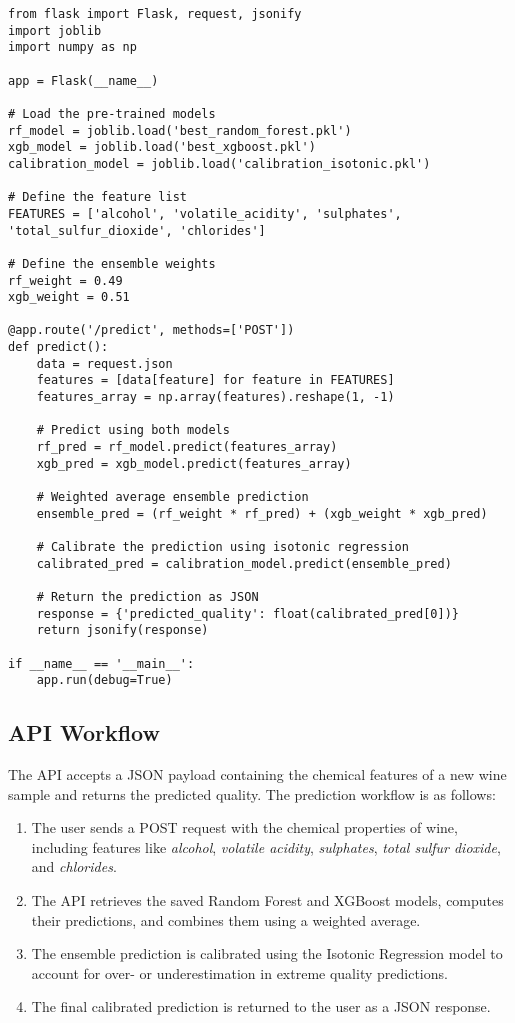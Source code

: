 \documentclass{article}
\begin{document}
\begin{verbatim}
from flask import Flask, request, jsonify
import joblib
import numpy as np

app = Flask(__name__)

# Load the pre-trained models
rf_model = joblib.load('best_random_forest.pkl')
xgb_model = joblib.load('best_xgboost.pkl')
calibration_model = joblib.load('calibration_isotonic.pkl')

# Define the feature list
FEATURES = ['alcohol', 'volatile_acidity', 'sulphates', 'total_sulfur_dioxide', 'chlorides']

# Define the ensemble weights
rf_weight = 0.49
xgb_weight = 0.51

@app.route('/predict', methods=['POST'])
def predict():
    data = request.json
    features = [data[feature] for feature in FEATURES]
    features_array = np.array(features).reshape(1, -1)
    
    # Predict using both models
    rf_pred = rf_model.predict(features_array)
    xgb_pred = xgb_model.predict(features_array)
    
    # Weighted average ensemble prediction
    ensemble_pred = (rf_weight * rf_pred) + (xgb_weight * xgb_pred)
    
    # Calibrate the prediction using isotonic regression
    calibrated_pred = calibration_model.predict(ensemble_pred)
    
    # Return the prediction as JSON
    response = {'predicted_quality': float(calibrated_pred[0])}
    return jsonify(response)

if __name__ == '__main__':
    app.run(debug=True)
\end{verbatim}

\subsection{API Workflow}
The API accepts a JSON payload containing the chemical features of a new wine sample and returns the predicted quality. The prediction workflow is as follows:
\begin{enumerate}
    \item The user sends a POST request with the chemical properties of wine, including features like \textit{alcohol}, \textit{volatile acidity}, \textit{sulphates}, \textit{total sulfur dioxide}, and \textit{chlorides}.
    \item The API retrieves the saved Random Forest and XGBoost models, computes their predictions, and combines them using a weighted average.
    \item The ensemble prediction is calibrated using the Isotonic Regression model to account for over- or underestimation in extreme quality predictions.
    \item The final calibrated prediction is returned to the user as a JSON response.
\end{enumerate}
\end{document}
